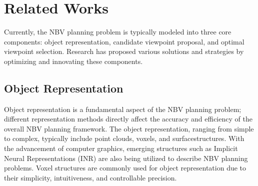 \section{Related Works}
\label{sec:related}

Currently, the NBV planning problem is typically modeled into three core components: object representation, candidate viewpoint proposal, and optimal viewpoint selection. Research has proposed various solutions and strategies by optimizing and innovating these components.

\subsection{Object Representation}
Object representation is a fundamental aspect of the NBV planning problem; different representation methods directly affect the accuracy and efficiency of the overall NBV planning framework.
The object representation, ranging from simple to complex, typically include point clouds\cite{border2024surface, zeng2020pc,dhami2023pred}, voxels\cite{connolly1985determination,pan2021global,potthast2014probabilistic,vasquez2014view,pan2022scvp,mendoza2020supervised,song2020online,zhou2021fuel,batinovic2021multi,vasquez2018tree,deng2020frontier,batinovic2022shadowcasting}, and surface\cite{roberts2017submodular,peng2019adaptive,wu2014quality}structures.
With the advancement of computer graphics, emerging structures such as Implicit Neural Representations (INR)\cite{ran2023neurar,lee2022uncertainty, jin2023neu} are also being utilized to describe NBV planning problems.
Voxel structures are commonly used for object representation due to their simplicity, intuitiveness, and controllable precision.

